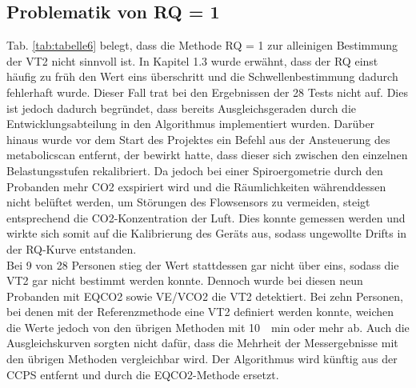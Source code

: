 \subsection{Problematik von RQ = 1}
%
Tab. \ref{tab:tabelle6} belegt, dass die Methode RQ = 1 zur alleinigen Bestimmung der VT2 nicht sinnvoll ist. In Kapitel 1.3 wurde erwähnt, dass der RQ einst häufig zu früh den Wert eins überschritt und die Schwellenbestimmung dadurch fehlerhaft wurde. Dieser Fall trat bei den Ergebnissen der 28 Tests nicht auf. Dies ist jedoch dadurch begründet, dass bereits Ausgleichsgeraden durch die Entwicklungsabteilung in den Algorithmus implementiert wurden. Darüber hinaus wurde vor dem Start des Projektes ein Befehl aus der Ansteuerung des metabolicscan entfernt, der bewirkt hatte, dass dieser sich zwischen den einzelnen Belastungsstufen rekalibriert. Da jedoch bei einer Spiroergometrie durch den Probanden mehr \gls{CO2} exspiriert wird und die Räumlichkeiten währenddessen nicht belüftet werden, um Störungen des Flowsensors zu vermeiden, steigt entsprechend die \gls{CO2}-Konzentration der Luft. Dies konnte gemessen werden und wirkte sich somit auf die Kalibrierung des Geräts aus, sodass ungewollte Drifts in der RQ-Kurve entstanden.\\
Bei 9 von 28 Personen stieg der Wert stattdessen gar nicht über eins, sodass die VT2 gar nicht bestimmt werden konnte. Dennoch wurde bei diesen neun Probanden mit \gls{EQCO2} sowie \gls{VE}/\gls{VCO2} die VT2 detektiert. Bei zehn Personen, bei denen mit der Referenzmethode eine VT2 definiert werden konnte, weichen die Werte jedoch von den übrigen Methoden mit \SI{10}{\per\minute} oder mehr ab. Auch die Ausgleichskurven sorgten nicht dafür, dass die Mehrheit der Messergebnisse mit den übrigen Methoden vergleichbar wird. Der Algorithmus wird künftig aus der \gls{CCPS} entfernt und durch die \gls{EQCO2}-Methode ersetzt.
%
